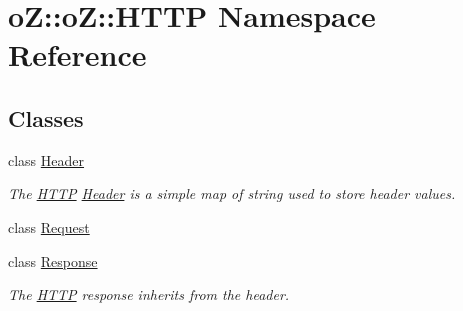 \hypertarget{namespaceo_z_1_1o_z_1_1_h_t_t_p}{}\section{oZ\+::oZ\+::H\+T\+TP Namespace Reference}
\label{namespaceo_z_1_1o_z_1_1_h_t_t_p}
\subsection*{Classes}
\begin{DoxyCompactItemize}
\item 
class \mbox{\hyperlink{classo_z_1_1o_z_1_1_h_t_t_p_1_1_header}{Header}}
\begin{DoxyCompactList}\small\item\em The \mbox{\hyperlink{namespaceo_z_1_1o_z_1_1_h_t_t_p}{H\+T\+TP}} \mbox{\hyperlink{classo_z_1_1o_z_1_1_h_t_t_p_1_1_header}{Header}} is a simple map of string used to store header values. \end{DoxyCompactList}\item 
class \mbox{\hyperlink{classo_z_1_1o_z_1_1_h_t_t_p_1_1_request}{Request}}
\item 
class \mbox{\hyperlink{classo_z_1_1o_z_1_1_h_t_t_p_1_1_response}{Response}}
\begin{DoxyCompactList}\small\item\em The \mbox{\hyperlink{namespaceo_z_1_1o_z_1_1_h_t_t_p}{H\+T\+TP}} response inherits from the header. \end{DoxyCompactList}\end{DoxyCompactItemize}
